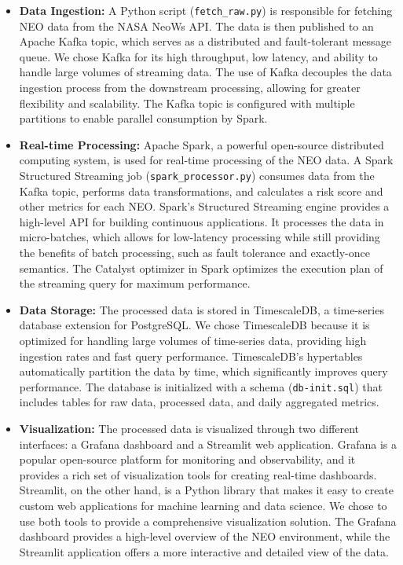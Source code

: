 \documentclass{article}
\begin{document}
\begin{itemize}
    \item \textbf{Data Ingestion:} A Python script (\texttt{fetch\_raw.py}) is responsible for fetching NEO data from the NASA NeoWs API. The data is then published to an Apache Kafka topic, which serves as a distributed and fault-tolerant message queue. We chose Kafka for its high throughput, low latency, and ability to handle large volumes of streaming data. The use of Kafka decouples the data ingestion process from the downstream processing, allowing for greater flexibility and scalability. The Kafka topic is configured with multiple partitions to enable parallel consumption by Spark.

    \item \textbf{Real-time Processing:} Apache Spark, a powerful open-source distributed computing system, is used for real-time processing of the NEO data. A Spark Structured Streaming job (\texttt{spark\_processor.py}) consumes data from the Kafka topic, performs data transformations, and calculates a risk score and other metrics for each NEO. Spark's Structured Streaming engine provides a high-level API for building continuous applications. It processes the data in micro-batches, which allows for low-latency processing while still providing the benefits of batch processing, such as fault tolerance and exactly-once semantics. The Catalyst optimizer in Spark optimizes the execution plan of the streaming query for maximum performance.

    \item \textbf{Data Storage:} The processed data is stored in TimescaleDB, a time-series database extension for PostgreSQL. We chose TimescaleDB because it is optimized for handling large volumes of time-series data, providing high ingestion rates and fast query performance. TimescaleDB's hypertables automatically partition the data by time, which significantly improves query performance. The database is initialized with a schema (\texttt{db-init.sql}) that includes tables for raw data, processed data, and daily aggregated metrics.

    \item \textbf{Visualization:} The processed data is visualized through two different interfaces: a Grafana dashboard and a Streamlit web application. Grafana is a popular open-source platform for monitoring and observability, and it provides a rich set of visualization tools for creating real-time dashboards. Streamlit, on the other hand, is a Python library that makes it easy to create custom web applications for machine learning and data science. We chose to use both tools to provide a comprehensive visualization solution. The Grafana dashboard provides a high-level overview of the NEO environment, while the Streamlit application offers a more interactive and detailed view of the data.
\end{itemize}
\end{document}
